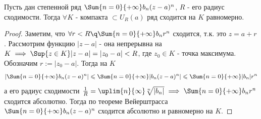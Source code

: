 \begin{theorem}[(Абеля)]
  Пусть дан степенной ряд $\Sum{n=0}{+\infty}b_n(z-a)^n$, $R$ - его радиус сходимости. Тогда $\forall K$ - компакта $\subset U_R(a)$ ряд сходится на $K$ равномерно.
\end{theorem}
\begin{proof}
  Заметим, что $\forall r<R\q \Sum{n=0}{+\infty}b_nr^n$ сходится, т.к. это $z=a+r$. Рассмотрим функцию $|z-a|$ - она непрерывна на $K\implies \Sup{z\in K}|z-a|=|z_0-a|<R$, где $z_0\in K$ - точка максимума. Обозначим $r:=|z_0-a|$. Тогда на $K$ 
  \[\left|\Sum{n=0}{+\infty}b_n(z-a)^n\right|\leqslant \Sum{n=0}{+\infty}|b_n(z-a)^n|\leqslant \Sum{n=0}{+\infty}|b_n|r^n\]
  а его радиус сходимости $\frac{1}{R}=\uplim{n}{\infty}\sqrt[n]{|b_n|}\implies \Sum{n=0}{+\infty}b_nr^n$ сходится абсолютно. Тогда по теореме Вейерштрасса $\Sum{n=0}{+\infty}b_n(z-a)^n$ сходится абсолютно и равномерно на $K$. 
\end{proof}
